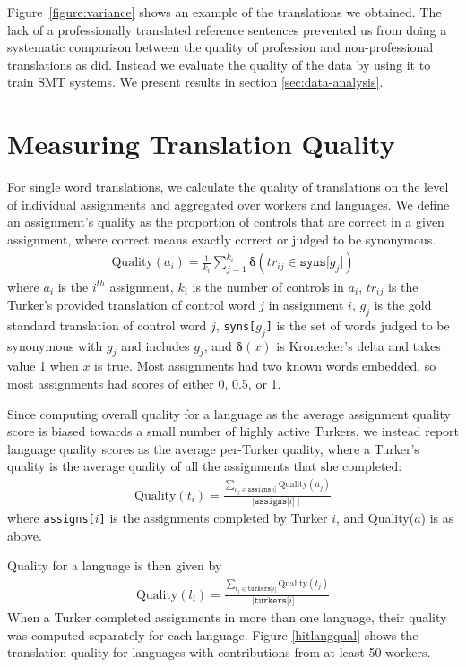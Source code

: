 \documentclass[11pt]{article}
\begin{document}
Figure~\ref{figure:variance} shows an example of the translations we obtained. The lack of a professionally translated reference sentences prevented us from doing a systematic comparison between the quality of profession and non-professional translations as   did. Instead we evaluate the quality of the data by using it to train SMT systems. We present results in section \ref{sec:data-analysis}.



\section{Measuring Translation Quality}

For single word translations, we calculate the quality of translations on the level of individual assignments and aggregated over workers and languages.  We define an assignment's quality as the proportion of controls that are correct in a given assignment, where correct means exactly correct or judged to be synonymous.
\begin{align}	
	\text{Quality}(a_i) = \frac{1}{k_i}\sum\limits_{j=1}^{k_i}\mathbf{\delta}(tr_{ij} \in \texttt{syns[$g_j$]})
\end{align}	
where $a_i$ is the $i^{th}$ assignment, $k_i$ is the number of controls in $a_i$, $tr_{ij}$ is the Turker's provided translation of control word $j$ in assignment $i$, $g_j$ is the gold standard translation of control word $j$, \texttt{syns[$g_j$]} is the set of words judged to be synonymous with $g_j$ and includes $g_j$, and $\mathbf{\delta}(x)$ is Kronecker's delta and takes value 1 when $x$ is true. 
Most assignments had two known words embedded, so most assignments had scores of either 0, 0.5, or 1. 


Since computing overall quality for a language as the average assignment quality score is biased towards a small number of highly active Turkers, we instead report language quality scores as the average per-Turker quality, where a Turker's quality is  the average quality of all the assignments that she completed:
\begin{align}	
	\text{Quality}(t_i) = \frac{\sum_{a_j \in \texttt{assigns[$i$]}}\text{Quality}(a_j)}{\mid \texttt{assigns[$i$]} \mid}
\end{align}	
where \texttt{assigns[$i$]} is the assignments completed by Turker $i$, and Quality($a$) is as above.

Quality for a language is then given by
\begin{align}	
	\text{Quality}(l_i) = \frac{\sum_{t_j \in \texttt{turkers[$i$]}}\text{Quality}(t_j)}{\mid \texttt{turkers[$i$]} \mid}
\end{align}	
When a Turker completed assignments in more than one language, their quality was computed separately for each language. Figure \ref{hitlangqual} shows the translation quality for languages with contributions from at least 50 workers.  
\end{document}
